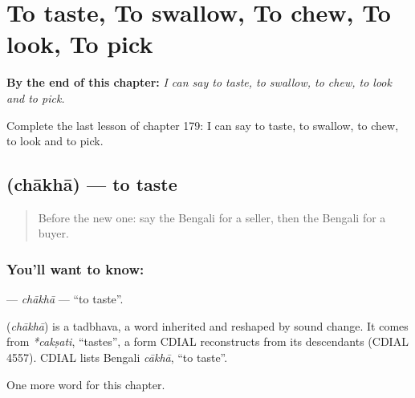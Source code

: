 
\chapter{To taste, To swallow, To chew, To look, To pick}
\label{ch:bn-to-taste-to-swallow-to-chew-to-look-to-pick}

\begin{chapteropening}
\textbf{By the end of this chapter:} \emph{I can say to taste, to swallow, to chew, to look and to pick.}

Complete the last lesson of chapter 179: I can say to taste, to swallow, to chew, to look and to pick.
\end{chapteropening}

\section[\texorpdfstring{\bn{চাখা} (chākhā)}{চাখা (chākhā)}]{ (chākhā) — to taste}

\label{lesson:BN-C179-chakha}



\begin{quote}
Before the new one: say the Bengali for a seller, then the Bengali for a buyer.
\end{quote}

\subsection*{You'll want to know: }
\textbf{} — \emph{chākhā} — \textquotedblleft{}to taste\textquotedblright{}.

\begin{cousinweb}
\textbf{} (\emph{chākhā}) is a tadbhava, a word inherited and reshaped by sound change. It comes from \emph{*cakṣati}, \textquotedblleft{}tastes\textquotedblright{}, a form CDIAL reconstructs from its descendants (CDIAL 4557). CDIAL lists Bengali \emph{cākhā}, \textquotedblleft{}to taste\textquotedblright{}.
\end{cousinweb}

\begin{grammarlens}[title={What you've built}]
One more word for this chapter.
\end{grammarlens}

